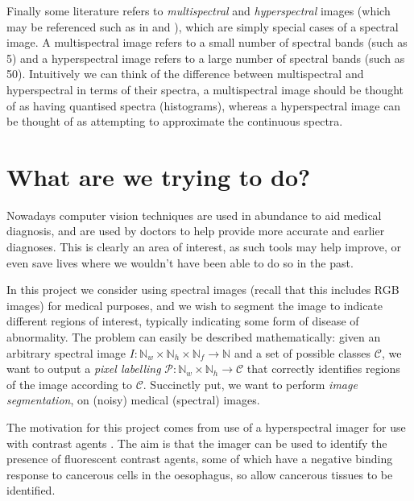 \documentclass[12pt,twoside,notitlepage]{report}
\newcommand{\cl}[1]{\mathcal{#1}}
\newcommand{\bb}[1]{\mathbb{#1}}
\begin{document}
        Finally some literature refers to \textit{multispectral} and \textit{hyperspectral} images (which may be 
        referenced such as in \cite{Luthman:2015:hyperspectralImager} and \cite{Bioucas-Dias:2012:unmixingOverview}), 
        which are simply special cases of a spectral image. A multispectral image refers to a small number of spectral 
        bands (such as 5) and a hyperspectral image refers to a large number of spectral bands (such as 50). Intuitively 
        we can think of the difference between multispectral and hyperspectral in terms of their spectra, a 
        multispectral image should be thought of as having quantised spectra (histograms), whereas a hyperspectral 
        image can be thought of as attempting to approximate the continuous spectra.


    \section{What are we trying to do?} \label{sec:what_are_we_trying_to_do}
        Nowadays computer vision techniques are used in abundance to aid medical diagnosis, and are used by doctors 
        to help provide more accurate and earlier diagnoses. This is clearly an area of interest, as such tools 
        may help improve, or even save lives where we wouldn't have been able to do so in the past. 

        In this project we consider using spectral images (recall that this includes RGB images) for medical purposes, 
        and we wish to segment the image to indicate different regions of interest, typically indicating some form of 
        disease of abnormality. The problem can easily be described mathematically: given an arbitrary spectral image 
        $I : \bb{N}_w \times \bb{N}_h \times \bb{N}_f \rightarrow \bb{N}$ and a set of possible classes 
        $\cl{C}$, we want to output a \textit{pixel labelling} $\cl{P} : \bb{N}_w \times \bb{N}_h 
        \rightarrow \cl{C}$ that correctly identifies regions of the image according to $\cl{C}$. Succinctly 
        put, we want to perform \textit{image segmentation}, on (noisy) medical (spectral) images.

        The motivation for this project comes from use of a hyperspectral imager for use with contrast agents 
        \cite{Luthman:2015:hyperspectralImager}. The aim is that the imager can be used to identify the presence of 
        fluorescent contrast agents, some of which have a negative binding response to cancerous cells in the oesophagus, 
        so allow cancerous tissues to be identified.
\end{document}
